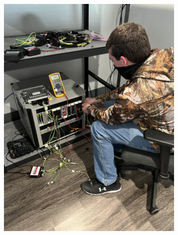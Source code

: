 \documentclass[journal,twoside,web]{ieeecolor}
\begin{document}
\begin{figure}
    \centering
    \begin{subfigure}[b]{0.48\linewidth}
		\centering    		
    		\includegraphics[angle=270,width=0.9\linewidth]{figs/img/picturesVisitToAStuff/aStuffVisit2Nick}
    		\caption{}
    \end{subfigure}
    \begin{subfigure}[b]{0.48\linewidth}
		\centering    		

\end{subfigure}
\end{figure}
\end{document}
